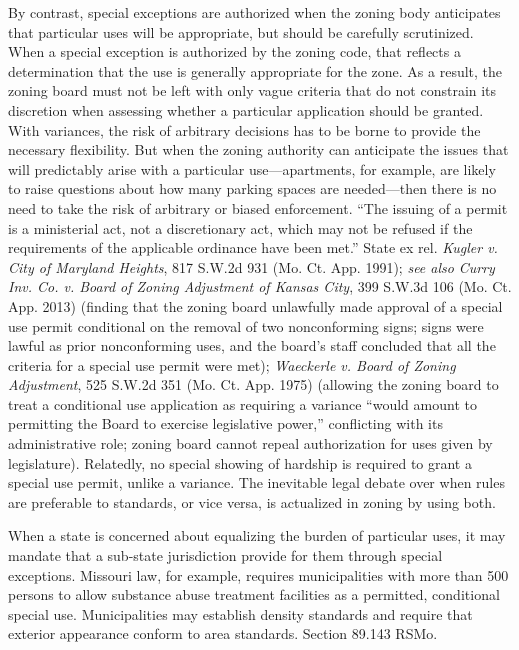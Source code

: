 By contrast, special exceptions are authorized when the zoning body anticipates
that particular uses will be appropriate, but should be carefully scrutinized.
When a special exception is authorized by the zoning code, that reflects a
determination that the use is generally appropriate for the zone. As a result,
the zoning board must not be left with only vague criteria that do not constrain
its discretion when assessing whether a particular application should be
granted. With variances, the risk of arbitrary decisions has to be borne to
provide the necessary flexibility. But when the zoning authority can anticipate
the issues that will predictably arise with a particular use---apartments, for
example, are likely to raise questions about how many parking spaces are
needed---then there is no need to take the risk of arbitrary or biased
enforcement. ``The issuing of a permit is a ministerial act, not a discretionary
act, which may not be refused if the requirements of the applicable ordinance
have been met.'' State ex rel. \emph{Kugler v. City of Maryland Heights}, 817
S.W.2d 931 (Mo. Ct. App. 1991); \textit{see also} \emph{Curry Inv. Co. v. Board
of Zoning Adjustment of Kansas City}, 399 S.W.3d 106 (Mo. Ct. App. 2013)
(finding that the zoning board unlawfully made approval of a special use permit
conditional on the removal of two nonconforming signs; signs were lawful as
prior nonconforming uses, and the board's staff concluded that all the criteria
for a special use permit were met); \emph{Waeckerle v. Board of Zoning
Adjustment}, 525 S.W.2d 351 (Mo. Ct. App. 1975) (allowing the zoning board to
treat a conditional use application as requiring a variance ``would amount to
permitting the Board to exercise legislative power,'' conflicting with its
administrative role; zoning board cannot repeal authorization for uses given by
legislature). Relatedly, no special showing of hardship is required to grant a
special use permit, unlike a variance. The inevitable legal debate over when
rules are preferable to standards, or vice versa, is actualized in zoning by
using both. 

When a state is concerned about equalizing the burden of particular uses, it may
mandate that a sub-state jurisdiction provide for them through special
exceptions. Missouri law, for example, requires municipalities with more than
500 persons to allow substance abuse treatment facilities as a permitted,
conditional special use. Municipalities may establish density standards and
require that exterior appearance conform to area standards. Section 89.143 RSMo.

